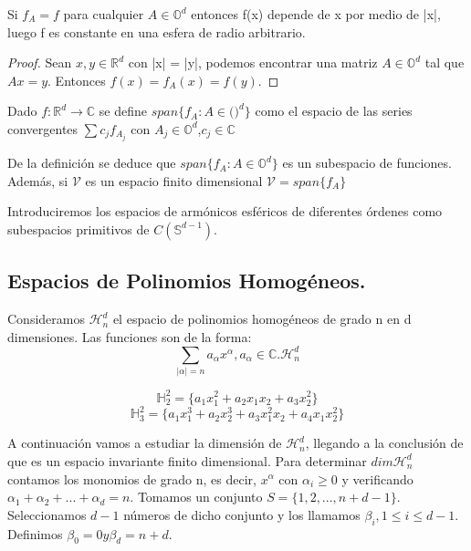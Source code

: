 \begin{prop}
Si $f_A=f$ para cualquier $A\in \mathds{O}^d$ entonces f(x) depende de x por medio de |x|, luego f es constante en una esfera de radio arbitrario.
\end{prop}

\begin{proof} Sean $x,y \in \mathds{R}^d$ con |x| = |y|, podemos encontrar una matriz $A \in \mathds{O}^d$ tal que $Ax = y$. Entonces $f(x)=f_A(x)=f(y)$.
	
\end{proof}

\begin{defn}Dado $f:\mathds{R}^d \to \mathds{C}$ se define $span\{f_A : A \in \mathcal()^d\}$ como el espacio de las series convergentes $\sum c_jf_{A_j}$ con $A_j \in \mathds{O}^d$,$c_j \in \mathds{C}$ 
\end{defn}
De la definición se deduce que $span\{f_A : A \in \mathds{O}^d\}$ es un subespacio de funciones. Además, si $\mathcal{V}$ es un espacio finito dimensional $\mathcal{V} = span\{f_A\}$
\medskip

Introduciremos los espacios de armónicos esféricos de diferentes órdenes como subespacios primitivos de $C(\mathds{S}^{d-1})$. 
\subsection{Espacios de Polinomios Homogéneos.}
Consideramos $\mathcal{H}^d_n$ el espacio de polinomios homogéneos de grado n en d dimensiones. Las funciones son de la forma:
$$
\sum_{|\alpha|=n}a_\alpha x^\alpha, a_\alpha \in \mathds{C}.\mathcal{H}^d_n
$$
\begin{example}
	$$
		\mathds{H}^2_2 = \{ a_1x_1^2 + a_2x_1x_2 + a_3x_2^2\} 
   $$
$$		\mathds{H}^2_3 = \{ a_1x_1^3 + a_2x_2^3 + a_3x_1^2x_2 + a_4x_1x_2^2 \}
	$$
\end{example}
\medskip
A continuación vamos a estudiar la dimensión de  $\mathcal{H}^d_n$, llegando a la conclusión de que es un espacio invariante finito dimensional.
Para determinar $dim \mathcal{H}^d_n$ contamos los monomios de grado n, es decir, $x^\alpha$ con $\alpha_i \ge 0$ y verificando $\alpha_1 + \alpha_2 + ... + \alpha_d = n$. Tomamos un conjunto $S=\{1,2,...,n+d-1\}$. Seleccionamos $d-1$ números de dicho conjunto y los llamamos $\beta_i, 1\leq i \leq d-1$. Definimos  $\beta_0 = 0 y \beta_d = n+d$.

